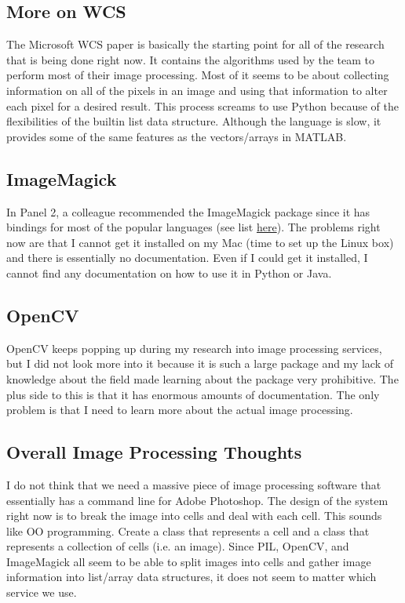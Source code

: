 \documentclass[]{article}
\begin{document}
		
		\subsection{More on WCS}
			The Microsoft WCS paper is basically the starting point for all of the research that is being done right now. It contains the algorithms used by the team to perform most of their image processing. Most of it seems to be about collecting information on all of the pixels in an image and using that information to alter each pixel for a desired result. This process screams to use Python because of the flexibilities of the builtin list data structure. Although the language is slow, it provides some of the same features as the vectors/arrays in MATLAB. 
			
		\subsection{ImageMagick}
			In Panel 2, a colleague recommended the ImageMagick package since it has bindings for most of the popular languages (see list \href{http://www.imagemagick.org/script/api.php}{here}). The problems right now are that I cannot get it installed on my Mac (time to set up the Linux box) and there is essentially no documentation. Even if I could get it installed, I cannot find any documentation on how to use it in Python or Java.
			
		\subsection{OpenCV}
			OpenCV keeps popping up during my research into image processing services, but I did not look more into it because it is such a large package and my lack of knowledge about the field made learning about the package very prohibitive. The plus side to this is that it has enormous amounts of documentation. The only problem is that I need to learn more about the actual image processing. 
			
		\subsection{Overall Image Processing Thoughts}
			I do not think that we need a massive piece of image processing software that essentially has a command line for Adobe Photoshop. The design of the system right now is to break the image into cells and deal with each cell. This sounds like OO programming. Create a class that represents a cell and a class that represents a collection of cells (i.e. an image). Since PIL, OpenCV, and ImageMagick all seem to be able to split images into cells and gather image information into list/array data structures, it does not seem to matter which service we use. 
			
\end{document}
